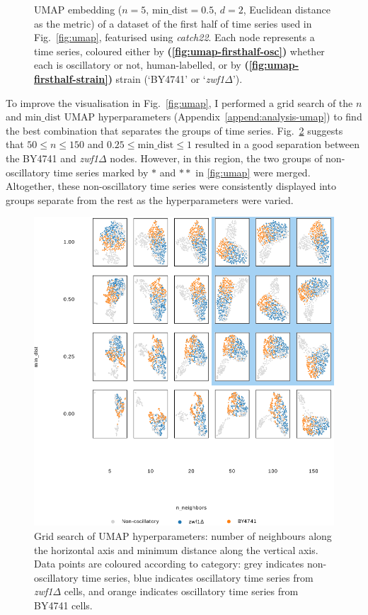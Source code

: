 \begin{figure}
  \caption[
      UMAP embedding of a dataset of the first half of time series, featurised using \textit{catch22}.
    ]{
      UMAP embedding ($n=5$, $\mathrm{min\_dist} = 0.5$, $d=2$, Euclidean distance as the metric) of a dataset of the first half of time series used in Fig.\ \ref{fig:umap}, featurised using \textit{catch22}.
      Each node represents a time series, coloured either by
      \textbf{(\ref{fig:umap-firsthalf-osc})}
      whether each is oscillatory or not, human-labelled, or by
      \textbf{(\ref{fig:umap-firsthalf-strain})}
      strain (`BY4741' or `\textit{zwf1$\Delta$}').
    }
  \label{fig:umap-firsthalf}
\end{figure}


To improve the visualisation in Fig.\ \ref{fig:umap}, I performed a grid search of the $n$ and $\mathrm{min\_dist}$ UMAP hyperparameters (Appendix~\ref{append:analysis-umap}) to find the best combination that separates the groups of time series.
Fig.\ \ref{fig:umap-gridsearch} suggests that $50 \leq n \leq 150$ and $0.25 \leq \mathrm{min\_dist} \leq 1$ resulted in a good separation between the BY4741 and \textit{zwf1$\Delta$} nodes.
However, in this region, the two groups of non-oscillatory time series marked by $\ast$ and $\ast \ast$ in \ref{fig:umap} were merged.
Altogether, these non-oscillatory time series were consistently displayed into groups separate from the rest as the hyperparameters were varied.

\begin{figure}
  \centering
    \includegraphics[width=0.9\linewidth]{umap_grid_is20016_edit3.png}
    \caption[
      Grid search of UMAP hyperparameters.
    ]{
      Grid search of UMAP hyperparameters: number of neighbours along the horizontal axis and minimum distance along the vertical axis.
      Data points are coloured according to category: grey indicates non-oscillatory time series, blue indicates oscillatory time series from \textit{zwf1$\Delta$} cells, and orange indicates oscillatory time series from BY4741 cells.
    }
  \label{fig:umap-gridsearch}
\end{figure}


